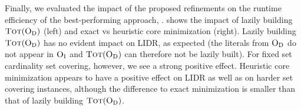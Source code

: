 Finally, we evaluated the impact of the proposed refinements on the runtime efficiency of the best-performing approach, \msh{}.
 shows the impact of lazily building $\textsc{Tot}(\textsc{O}_{\text{D}})$ (left) and exact vs heuristic core minimization (right).
Lazily building $\textsc{Tot}(\textsc{O}_{\text{D}})$ has no evident impact on LIDR, as expected (the literals from $\textsc{O}_{\text{D}}$ do not appear in $\textsc{O}_{\text{I}}$ and $\textsc{Tot}(\textsc{O}_{\text{D}})$ can therefore not be lazily built).
For fixed set cardinality set covering, however, we see a strong positive effect.
Heuristic core minimization appears to have a positive effect  on LIDR as well as on harder set covering instances, although the difference to exact minimization is smaller than that of lazily building $\textsc{Tot}(\textsc{O}_{\text{D}})$.
%
